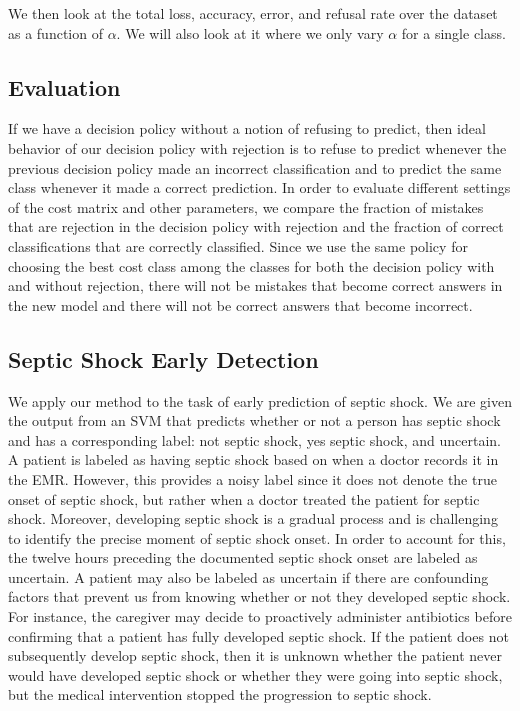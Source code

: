 \documentclass[12pt,solutions]{article}
\begin{document}
We then look at the total loss, accuracy, error, and refusal rate over the dataset as a function of $\alpha$. We will also look at it where we only vary $\alpha$ for a single class.

\subsection{Evaluation}
If we have a decision policy without a notion of refusing to predict, then ideal behavior of our decision policy with rejection is to refuse to predict whenever the previous decision policy made an incorrect classification and to predict the same class whenever it made a correct prediction. In order to evaluate different settings of the cost matrix and other parameters, we compare the fraction of mistakes that are rejection in the decision policy with rejection and the fraction of correct classifications that are correctly classified. Since we use the same policy for choosing the best cost class among the classes for both the decision policy with and without rejection, there will not be mistakes that become correct answers in the new model and there will not be correct answers that become incorrect. 

\subsection{Septic Shock Early Detection}

We apply our method to the task of early prediction of septic shock. We are given the output from an SVM that predicts whether or not a person has septic shock and has a corresponding label: not septic shock, yes septic shock, and uncertain. A patient is labeled as having septic shock based on when a doctor records it in the EMR. However, this provides a noisy label since it does not denote the true onset of septic shock, but rather when a doctor treated the patient for septic shock. Moreover, developing septic shock is a gradual process and is challenging to identify the precise moment of septic shock onset. In order to account for this, the twelve hours preceding the documented septic shock onset are labeled as uncertain. A patient may also be labeled as uncertain if there are confounding factors that prevent us from knowing whether or not they developed septic shock. For instance, the caregiver may decide to proactively administer antibiotics before confirming that a patient has fully developed septic shock. If the patient does not subsequently develop septic shock, then it is unknown whether the patient never would have developed septic shock or whether they were going into septic shock, but the medical intervention stopped the progression to septic shock. 
\end{document}
